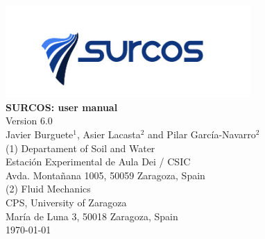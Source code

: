 \documentclass[11pt, twoside, openany, a4paper]{book}
\begin{document}

\nocite{*}




\pagestyle{empty}

\begin{titlepage} 
\begin{center} 
 
\includegraphics*[height=3.5cm]{images/logo_surcos.png}\\ 

\vspace*{3.5cm} 
{\Huge \textbf{SURCOS: user manual\\}}
\vspace*{1cm} 
{\normalsize Version 6.0}\\
\vspace*{1cm} 
{\Large Javier Burguete$^1$, Asier Lacasta$^2$ and Pilar García-Navarro$^2$}\\ 
\vspace*{2.5cm} 
{\normalsize (1) Departament of Soil and Water}\\
{Estación Experimental de Aula Dei / CSIC}\\ 
{Avda. Montañana 1005, 50059 Zaragoza, Spain}\\ 
\vspace*{1cm} 
{\normalsize (2) Fluid Mechanics}\\ 
{CPS, University of Zaragoza}\\ 
{María de Luna 3, 50018 Zaragoza, Spain}\\
\vspace*{1cm} 
{\normalsize \today}\\ 
\end{center} 
\end{titlepage} 
\cleardoublepage

\pagestyle{plain}

\tableofcontents
\listoffigures

\cleardoublepage

\pagestyle{headings}


\cleardoublepage


\cleardoublepage



%
\end{document}
